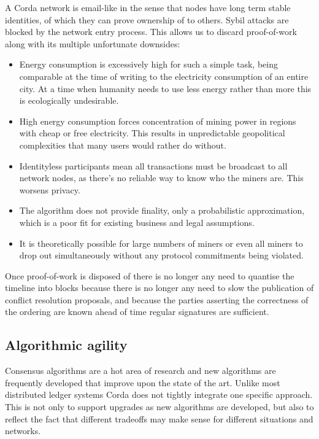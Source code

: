\documentclass{article}
\begin{document}
A Corda network is email-like in the sense that nodes have long term stable identities, of which they can prove
ownership of to others. Sybil attacks are blocked by the network entry process. This allows us to discard
proof-of-work along with its multiple unfortunate downsides:

\begin{itemize}
\item Energy consumption is excessively high for such a simple task, being comparable at the time of writing to the
electricity consumption of an entire city\cite{BitcoinEnergy}. At a time when humanity needs to use less energy
rather than more this is ecologically undesirable.
\item High energy consumption forces concentration of mining power in regions with cheap or free electricity.
This results in unpredictable geopolitical complexities that many users would rather do without.
\item Identityless participants mean all transactions must be broadcast to all network nodes, as there's no reliable
way to know who the miners are. This worsens privacy.
\item The algorithm does not provide finality, only a probabilistic approximation, which is a poor fit for existing
business and legal assumptions.\cite{Swanson}
\item It is theoretically possible for large numbers of miners or even all miners to drop out simultaneously without
any protocol commitments being violated.
\end{itemize}

Once proof-of-work is disposed of there is no longer any need to quantise the timeline into blocks because there is
no longer any need to slow the publication of conflict resolution proposals, and because the parties asserting the
correctness of the ordering are known ahead of time regular signatures are sufficient.

\subsection{Algorithmic agility}

Consensus algorithms are a hot area of research and new algorithms are frequently developed that improve upon the
state of the art. Unlike most distributed ledger systems Corda does not tightly integrate one specific approach.
This is not only to support upgrades as new algorithms are developed, but also to reflect the fact that different
tradeoffs may make sense for different situations and networks.
\end{document}
